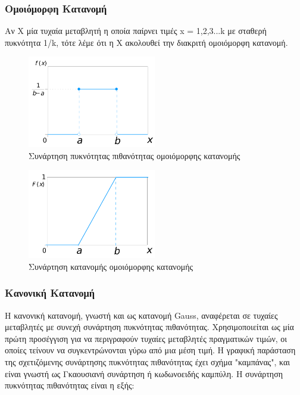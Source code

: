\subsubsection{Ομοιόμορφη Κατανομή}

Αν Χ μία τυχαία μεταβλητή η οποία παίρνει τιμές x = 1,2,3...k με σταθερή πυκνότητα 1/k, τότε λέμε ότι η Χ ακολουθεί την διακριτή ομοιόμορφη κατανομή. 

\begin{figure}[H]
  \centering
  \includegraphics[width=0.5\textwidth]{figures/uniform_1.png}
  \caption{Συνάρτηση πυκνότητας πιθανότητας ομοιόμορφης κατανομής}
\end{figure}

\begin{figure}[H]
  \centering
  \includegraphics[width=0.5\textwidth]{figures/uniform_2.png}
  \caption{Συνάρτηση κατανομής ομοιόμορφης κατανομής}
\end{figure}

\subsubsection{Κανονική Κατανομή}

Η κανονική κατανομή, γνωστή και ως κατανομή Gauss, αναφέρεται σε τυχαίες μεταβλητές με συνεχή συνάρτηση πυκνότητας πιθανότητας. Χρησιμοποιείται ως μία πρώτη προσέγγιση 
για να περιγραφούν τυχαίες μεταβλητές πραγματικών τιμών, οι οποίες τείνουν να συγκεντρώνονται γύρω από μια μέση τιμή. Η γραφική παράσταση της σχετιζόμενης συνάρτησης 
πυκνότητας πιθανότητας έχει σχήμα "καμπάνας", και είναι γνωστή ως Γκαουσιανή συνάρτηση ή κωδωνοειδής καμπύλη. Η συνάρτηση πυκνότητας πιθανότητας είναι η εξής:


